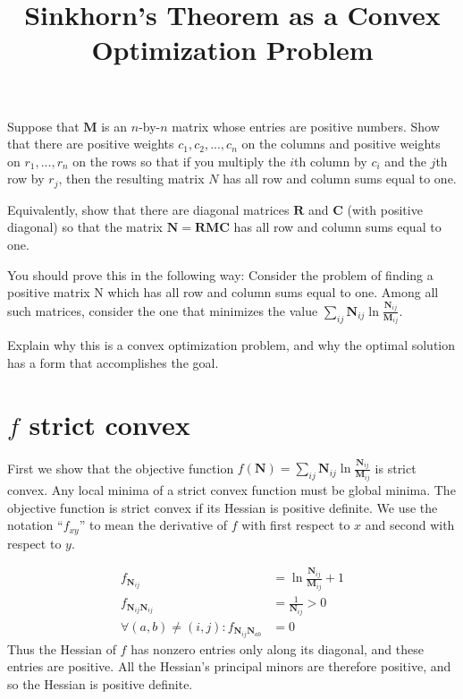 \documentclass[10pt,a4paper]{article}
\title{Sinkhorn's Theorem as a Convex Optimization Problem}
\newcommand{\matr}[1]{\mathbf{#1}} %
\begin{document}
\maketitle

Suppose that $\matr{M}$ is an $n$-by-$n$ matrix whose entries are positive numbers.  Show that there are positive weights $c_1, c_2, ..., c_n$ on the columns and positive weights on $r_1, ..., r_n$ on the rows so that if you multiply the $i$th column by $c_i$ and the $j$th row by $r_j$, then the resulting matrix $N$ has all row and column sums equal to one.

Equivalently, show that there are diagonal matrices $\matr{R}$ and $\matr{C}$ (with positive diagonal) so that the matrix $\matr{N}=\matr{R} \matr{M} \matr{C}$ has all row and column sums equal to one.

You should prove this in the following way:  Consider the problem of finding a positive matrix N which has all row and column sums equal to one.  Among all such matrices, consider the one that minimizes the value $\sum_{ij} \matr{N}_{ij} \ln \frac{\matr{N}_{ij}}{\matr{M}_{ij}}$.

Explain why this is a convex optimization problem, and why the optimal solution has a form that accomplishes the goal.

\section{$f$ strict convex}
First we show that the objective function $f(\matr{N}) = \sum_{ij} \matr{N}_{ij} \ln \frac{\matr{N}_{ij}}{\matr{M}_{ij}}$ 
is strict convex. Any local minima of a strict convex function must be global minima.
The objective function is strict convex if its Hessian is positive definite.
We use the notation ``$f_{xy}$'' to mean the derivative of $f$ with first respect to $x$ and 
second with respect to $y$.

\begin{align*}
f_{\matr{N}_{ij}} &= \ln{\frac{\matr{N}_{ij}}{\matr{M}_{ij}}} + 1 \\
f_{\matr{N}_{ij}\matr{N}_{ij}} &= \frac{1}{\matr{N}_{ij}} > 0\\
\forall (a,b) \neq (i,j): f_{\matr{N}_{ij}\matr{N}_{ab}} &= 0
\end{align*}
Thus the Hessian of $f$ has nonzero entries only along its diagonal, and these entries are positive.
All the Hessian's principal minors are therefore positive, and so the Hessian is positive definite.
\end{document}

